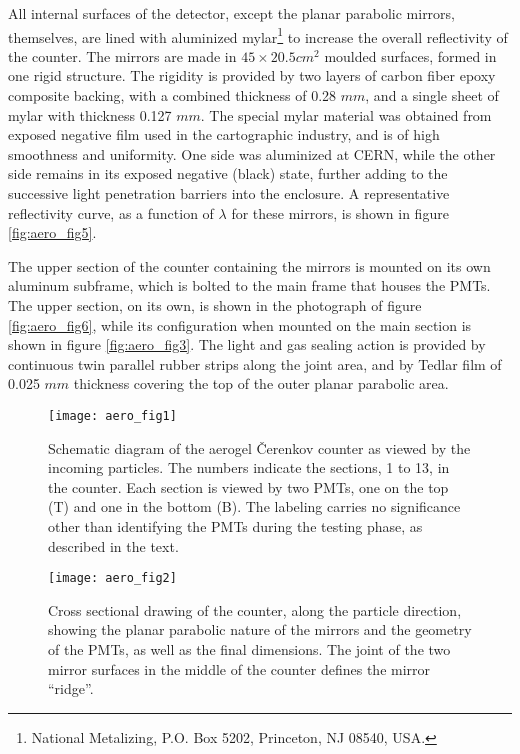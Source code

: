 All internal surfaces of the detector, except the planar parabolic mirrors,
themselves, are lined with aluminized 
mylar\footnote{National Metalizing, P.O. Box 5202, Princeton, NJ 08540, USA.} 
to increase the
overall reflectivity of the counter.  The mirrors are made in $45\times 20.5 
cm^2$ moulded surfaces, formed in one rigid structure. The rigidity is provided
by two layers of carbon fiber epoxy composite backing, with a combined
thickness of 0.28 $mm$, and a single sheet of mylar with thickness 0.127 $mm$. 
The special mylar material was obtained from exposed negative film used in the
cartographic industry, and is of high smoothness and uniformity.   One side was
aluminized at CERN, while the other side remains in its exposed negative
(black) state, further adding to the successive light penetration barriers into
the enclosure.   A representative reflectivity curve, as a function of
$\lambda$ for these mirrors, is shown in figure \ref{fig:aero_fig5}. 
 
The upper section of the counter containing the mirrors is mounted on its
own aluminum subframe, which is bolted to the main frame that houses the PMTs. 
The upper section, on its own, is shown in the photograph of
figure \ref{fig:aero_fig6}, while
its configuration when mounted on the main section is shown in
figure \ref{fig:aero_fig3}.  The
light and gas sealing action is provided by continuous twin parallel rubber
strips along the joint area, and by Tedlar film of 0.025 $mm$ thickness
covering the top of the outer planar parabolic area. 
\begin{figure}[p]
\texttt{[image: aero\_fig1]}
\caption[Aerogel:layout]{
 Schematic diagram of the aerogel \v{C}erenkov counter as viewed by the
 incoming particles.  The numbers indicate the sections, 1 to 13, in the
 counter. Each section is viewed by two PMTs, one on the top (T) and one in the
 bottom (B). The labeling carries no significance other than identifying the
 PMTs during the testing phase, as described in the text.
 }
\label{fig:aero_fig1}
\end{figure}

\begin{figure}[tbh]
\texttt{[image: aero\_fig2]}
\caption[Aerogel:mirrors]{
 Cross sectional drawing of the counter, along the particle direction, 
 showing the planar parabolic nature of the mirrors and the geometry of the 
 PMTs, as well as the final dimensions.  The joint of the two mirror surfaces in
 the middle of the counter defines the mirror ``ridge''.
 }
\label{fig:aero_fig2}
\end{figure}

